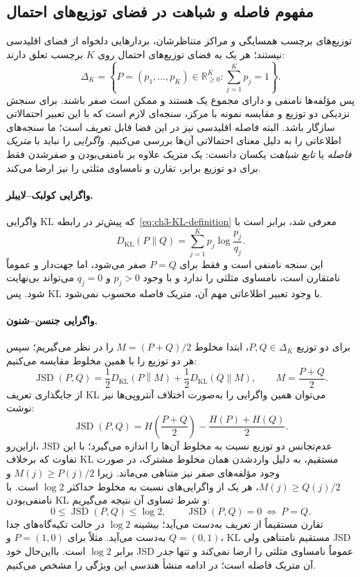 \subsection{مفهوم فاصله و شباهت در فضای توزیع‌های احتمال}
\label{subsec:ch3-probability-distance-similarity}
توزیع‌های برچسب همسایگی و مراکز متناظرشان،
بردارهایی دلخواه از فضای اقلیدسی نیستند؛
هر یک به فضای توزیع‌های احتمال روی $K$ برچسب تعلق دارند:
\[
\Delta_K=\left\{P=(p_1,\ldots,p_K)\in\mathbb R_{\ge0}^{K}:
\sum_{j=1}^{K}p_j=1\right\}.
\]
پس مؤلفه‌ها نامنفی و دارای مجموع یک هستند
و ممکن است صفر باشند. برای سنجش نزدیکی
دو توزیع و مقایسه نمونه با مرکز،
سنجه‌ای لازم است که با این تعبیر احتمالاتی
سازگار باشد. البته فاصله اقلیدسی نیز در این فضا
قابل تعریف است؛ ما سنجه‌های اطلاعاتی را
به دلیل معنای احتمالاتی آن‌ها بررسی می‌کنیم.
\emph{واگرایی} را نباید با \emph{متریک فاصله}
یا \emph{تابع شباهت} یکسان دانست:
یک متریک علاوه بر نامنفی‌بودن و صفرشدن
فقط برای دو توزیع برابر، تقارن و
نامساوی مثلثی را نیز ارضا می‌کند.

\paragraph{واگرایی کولبک--لایبلر.}
واگرایی KL که پیش‌تر در
رابطه~\eqref{eq:ch3-KL-definition} معرفی شد،
برابر است با
\[
D_{\mathrm{KL}}(P\|Q)
=\sum_{j=1}^{K}p_j\log\frac{p_j}{q_j}.
\]
این سنجه نامنفی است و فقط برای $P=Q$ صفر می‌شود،
اما جهت‌دار و عموماً نامتقارن است،
نامساوی مثلثی را ندارد و با وجود
$p_j>0$ و $q_j=0$ می‌تواند بی‌نهایت شود.
پس KL با وجود تعبیر اطلاعاتی مهم آن،
متریک فاصله محسوب نمی‌شود.

\paragraph{واگرایی جنسن--شنون.}
برای دو توزیع $P,Q\in\Delta_K$،
ابتدا مخلوط $M=(P+Q)/2$ را در نظر می‌گیریم؛
سپس هر دو توزیع را با همین مخلوط مقایسه می‌کنیم:
\begin{equation}\label{eq:ch3-JSD-definition}
\operatorname{JSD}(P,Q)
=\frac12D_{\mathrm{KL}}\!\left(P\middle\|M\right)
+\frac12D_{\mathrm{KL}}\!\left(Q\middle\|M\right),
\qquad M=\frac{P+Q}{2}.
\end{equation}
از جایگذاری تعریف KL می‌توان همین واگرایی
را به‌صورت اختلاف آنتروپی‌ها نیز نوشت:
\begin{equation}\label{eq:ch3-JSD-entropy}
\operatorname{JSD}(P,Q)
=H\left(\frac{P+Q}{2}\right)
-\frac{H(P)+H(Q)}{2}.
\end{equation}
ازاین‌رو، JSD عدم‌تجانس دو توزیع
نسبت به مخلوط آن‌ها را اندازه می‌گیرد؛
با این تفاوت که برخلاف KL مستقیم،
به دلیل واردشدن همان مخلوط مشترک،
در صورت وجود مؤلفه‌های صفر نیز متناهی می‌ماند.
زیرا $M(j)\ge P(j)/2$ و $M(j)\ge Q(j)/2$،
هر یک از واگرایی‌های نسبت به مخلوط
حداکثر $\log2$ است. با نامنفی‌بودن KL
و شرط تساوی آن نتیجه می‌گیریم:
\[
0\le\operatorname{JSD}(P,Q)\le\log2,
\qquad
\operatorname{JSD}(P,Q)=0
\ \Longleftrightarrow\ P=Q.
\]
تقارن مستقیماً از تعریف به‌دست می‌آید؛
بیشینه $\log2$ در حالت تکیه‌گاه‌های
جدا به‌دست می‌آید. مثلاً برای
$P=(1,0)$ و $Q=(0,1)$،
KL مستقیم نامتناهی ولی JSD برابر $\log2$ است.
بااین‌حال خود JSD عموماً نامساوی مثلثی
را ارضا نمی‌کند و تنها \emph{جذر} آن
متریک فاصله است؛ در ادامه منشأ هندسی
این ویژگی را مشخص می‌کنیم.

